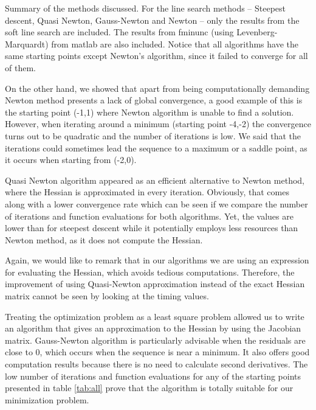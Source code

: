 \begin{table}[H]
\centering

\caption{Summary of the methods discussed. For the line search methods -- Steepest descent, Quasi Newton, Gauss-Newton and Newton -- only the results from the soft line search are included. The results from fminunc (using Levenberg-Marquardt) from matlab are also included. Notice that all algorithms have the same starting points except Newton's algorithm, since it failed to converge for all of them. }
\label{tab:all}
\end{table}

On the other hand, we showed that apart from being computationally demanding Newton method presents a lack of global convergence, a good example of this is the starting point (-1,1) where Newton algorithm is unable to find a solution. However, when iterating around a minimum (starting point -4,-2) the convergence turns out to be quadratic and the number of iterations is low. We said that the iterations could sometimes lead the sequence to a maximum or a saddle point, as it occurs when starting from (-2,0). 

Quasi Newton algorithm appeared as an efficient alternative to Newton method, where the Hessian is approximated in every iteration. Obviously, that comes along with a lower convergence rate which can be seen if we compare the number of iterations and function evaluations for both algorithms. Yet, the values are lower than for steepest descent while it potentially employs less resources than Newton method, as it does not compute the Hessian. 

Again, we would like to remark that in our algorithms we are using an expression for evaluating the Hessian, which avoids tedious computations. Therefore, the improvement of using Quasi-Newton approximation instead of the exact Hessian matrix cannot be seen by looking at the timing values.

Treating the optimization problem as a least square problem allowed us to write an algorithm that gives an approximation to the Hessian by using the Jacobian matrix. Gauss-Newton algorithm is particularly advisable when the residuals are close to 0, which occurs when the sequence is near a minimum. It also offers good computation results because there is no need to calculate second derivatives. The low number of iterations and function evaluations for any of the starting points presented in table \ref{tab:all} prove that the algorithm is totally suitable for our minimization problem.


